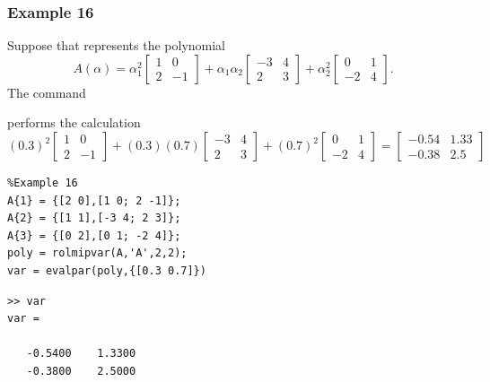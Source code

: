 \documentclass[english,11pt]{article}
\theoremstyle{break} \theorembodyfont{\small\rm}
\begin{document}
\subsubsection*{Example 16}

Suppose that  represents the polynomial
\[
 A(\alpha) = \alpha_1^2 \begin{bmatrix} 1 & 0 \\ 2 & -1 \end{bmatrix} +
 \alpha_1\alpha_2 \begin{bmatrix} -3 & 4 \\ 2 & 3 \end{bmatrix} +
 \alpha_2^2 \begin{bmatrix} 0 & 1 \\ -2 & 4 \end{bmatrix}.
\]
The command

\vspace{0.5cm}%
\noindent\begin{minipage}{\linewidth}
\end{minipage}
\vspace{0.2cm}

\noindent performs the calculation
\[
 (0.3)^2 \begin{bmatrix} 1 & 0 \\ 2 & -1 \end{bmatrix} +
 (0.3)(0.7) \begin{bmatrix} -3 & 4 \\ 2 & 3 \end{bmatrix} +
 (0.7)^2 \begin{bmatrix} 0 & 1 \\ -2 & 4 \end{bmatrix} =
 \begin{bmatrix} -0.54 & 1.33 \\ -0.38 & 2.5 \end{bmatrix}
\]


\begin{minipage}{7.5cm}
 \begin{lstlisting}
%Example 16
A{1} = {[2 0],[1 0; 2 -1]};
A{2} = {[1 1],[-3 4; 2 3]};
A{3} = {[0 2],[0 1; -2 4]};
poly = rolmipvar(A,'A',2,2);
var = evalpar(poly,{[0.3 0.7]})
 \end{lstlisting}
\end{minipage}
\vspace{0.2cm}

\begin{minipage}{7.5cm}
\begin{lstlisting}[rulecolor=\color{red}]
>> var
var =

   -0.5400    1.3300
   -0.3800    2.5000
\end{lstlisting}
\end{minipage}
\vspace{0.2cm}
\end{document}
